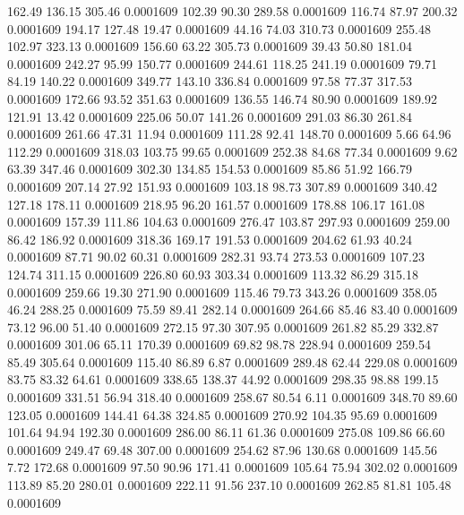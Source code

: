  162.49  136.15  305.46   0.0001609
 102.39   90.30  289.58   0.0001609
 116.74   87.97  200.32   0.0001609
 194.17  127.48   19.47   0.0001609
  44.16   74.03  310.73   0.0001609
 255.48  102.97  323.13   0.0001609
 156.60   63.22  305.73   0.0001609
  39.43   50.80  181.04   0.0001609
 242.27   95.99  150.77   0.0001609
 244.61  118.25  241.19   0.0001609
  79.71   84.19  140.22   0.0001609
 349.77  143.10  336.84   0.0001609
  97.58   77.37  317.53   0.0001609
 172.66   93.52  351.63   0.0001609
 136.55  146.74   80.90   0.0001609
 189.92  121.91   13.42   0.0001609
 225.06   50.07  141.26   0.0001609
 291.03   86.30  261.84   0.0001609
 261.66   47.31   11.94   0.0001609
 111.28   92.41  148.70   0.0001609
   5.66   64.96  112.29   0.0001609
 318.03  103.75   99.65   0.0001609
 252.38   84.68   77.34   0.0001609
   9.62   63.39  347.46   0.0001609
 302.30  134.85  154.53   0.0001609
  85.86   51.92  166.79   0.0001609
 207.14   27.92  151.93   0.0001609
 103.18   98.73  307.89   0.0001609
 340.42  127.18  178.11   0.0001609
 218.95   96.20  161.57   0.0001609
 178.88  106.17  161.08   0.0001609
 157.39  111.86  104.63   0.0001609
 276.47  103.87  297.93   0.0001609
 259.00   86.42  186.92   0.0001609
 318.36  169.17  191.53   0.0001609
 204.62   61.93   40.24   0.0001609
  87.71   90.02   60.31   0.0001609
 282.31   93.74  273.53   0.0001609
 107.23  124.74  311.15   0.0001609
 226.80   60.93  303.34   0.0001609
 113.32   86.29  315.18   0.0001609
 259.66   19.30  271.90   0.0001609
 115.46   79.73  343.26   0.0001609
 358.05   46.24  288.25   0.0001609
  75.59   89.41  282.14   0.0001609
 264.66   85.46   83.40   0.0001609
  73.12   96.00   51.40   0.0001609
 272.15   97.30  307.95   0.0001609
 261.82   85.29  332.87   0.0001609
 301.06   65.11  170.39   0.0001609
  69.82   98.78  228.94   0.0001609
 259.54   85.49  305.64   0.0001609
 115.40   86.89    6.87   0.0001609
 289.48   62.44  229.08   0.0001609
  83.75   83.32   64.61   0.0001609
 338.65  138.37   44.92   0.0001609
 298.35   98.88  199.15   0.0001609
 331.51   56.94  318.40   0.0001609
 258.67   80.54    6.11   0.0001609
 348.70   89.60  123.05   0.0001609
 144.41   64.38  324.85   0.0001609
 270.92  104.35   95.69   0.0001609
 101.64   94.94  192.30   0.0001609
 286.00   86.11   61.36   0.0001609
 275.08  109.86   66.60   0.0001609
 249.47   69.48  307.00   0.0001609
 254.62   87.96  130.68   0.0001609
 145.56    7.72  172.68   0.0001609
  97.50   90.96  171.41   0.0001609
 105.64   75.94  302.02   0.0001609
 113.89   85.20  280.01   0.0001609
 222.11   91.56  237.10   0.0001609
 262.85   81.81  105.48   0.0001609

